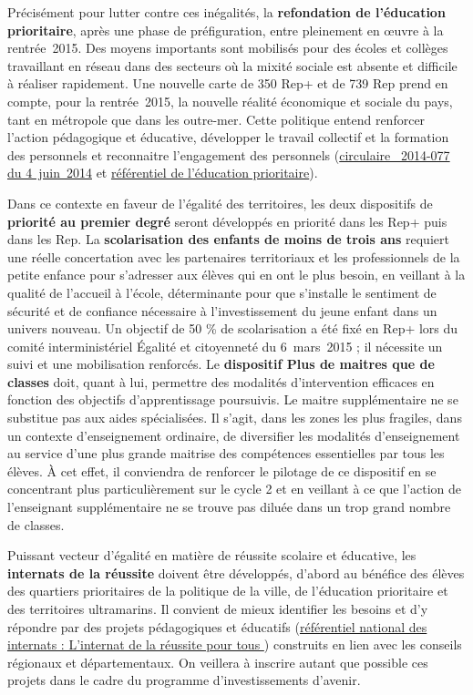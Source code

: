 Précisément pour lutter contre ces inégalités, la \textbf{refondation de l’éducation prioritaire}, après une phase de préfiguration, entre pleinement en œuvre à la rentrée~2015. Des moyens importants sont mobilisés pour des écoles et collèges travaillant en réseau dans des secteurs où la mixité sociale est absente et difficile à réaliser rapidement. Une nouvelle carte de 350 Rep+ et de 739 Rep prend en compte, pour la rentrée~2015, la nouvelle réalité économique et sociale du pays, tant en métropole que dans les outre-mer. Cette politique entend renforcer l’action pédagogique et éducative, développer le travail collectif et la formation des personnels et reconnaitre l’engagement des personnels (\href{http://www.education.gouv.fr/pid25535/bulletin_officiel.html?cid_bo=80035}{circulaire \no{}~2014-077 du 4~juin~2014} et \href{http://cache.media.eduscol.education.fr/file/education_prioritaire_et_accompagnement/53/5/referentiel_education_prioritaire_294535.pdf}{référentiel de l’éducation prioritaire}).

Dans ce contexte en faveur de l’égalité des territoires, les deux dispositifs de \textbf{priorité au premier degré} seront développés en priorité dans les Rep+ puis dans les Rep. La \textbf{scolarisation des enfants de moins de trois ans} requiert une réelle concertation avec les partenaires territoriaux et les professionnels de la petite enfance pour s’adresser aux élèves qui en ont le plus besoin, en veillant à la qualité de l’accueil à l’école, déterminante pour que s’installe le sentiment de sécurité et de confiance nécessaire à l’investissement du jeune enfant dans un univers nouveau. Un objectif de 50 \% de scolarisation a été fixé en Rep+ lors du comité interministériel Égalité et citoyenneté du 6~mars~2015 ; il nécessite un suivi et une mobilisation renforcés. Le \textbf{dispositif Plus de maitres que de classes} doit, quant à lui, permettre des modalités d’intervention efficaces en fonction des objectifs d’apprentissage poursuivis. Le maitre supplémentaire ne se substitue pas aux aides spécialisées. Il s’agit, dans les zones les plus fragiles, dans un contexte d’enseignement ordinaire, de diversifier les modalités d’enseignement au service d’une plus grande maitrise des compétences essentielles par tous les élèves. À cet effet, il conviendra de renforcer le pilotage de ce dispositif en se concentrant plus particulièrement sur le cycle 2 et en veillant à ce que l’action de l’enseignant supplémentaire ne se trouve pas diluée dans un trop grand nombre de classes.

Puissant vecteur d’égalité en matière de réussite scolaire et éducative, les \textbf{internats de la réussite} doivent être développés, d’abord au bénéfice des élèves des quartiers prioritaires de la politique de la ville, de l’éducation prioritaire et des territoires ultramarins. Il convient de mieux identifier les besoins et d’y répondre par des projets pédagogiques et éducatifs (\href{http://cache.media.eduscol.education.fr/file/internat/01/5/REFERENTIEL_INTERNAT_vf_415015.pdf}{référentiel national des internats : \og L’internat de la réussite pour tous \fg{}}) construits en lien avec les conseils régionaux et départementaux. On veillera à inscrire autant que possible ces projets dans le cadre du programme d’investissements d’avenir.

